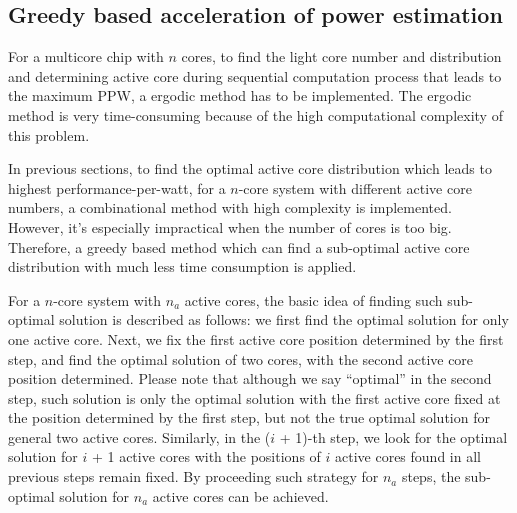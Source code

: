 \subsection{Greedy based acceleration of power estimation}
For a multicore chip with $n$ cores, to find the light core number and distribution and determining active core during sequential computation process that leads to the maximum PPW, a ergodic method has to be implemented. The ergodic method is very time-consuming because of the high computational complexity of this problem. 

In previous sections, to find the optimal active core distribution which leads to highest performance-per-watt, for a $n$-core system with different active core numbers,  a combinational method with high complexity is implemented. However, it's  especially impractical when the number of cores is too big. Therefore, a greedy based method which can find a sub-optimal active core distribution with much less time consumption is applied.

For a $n$-core system with $n_{a}$ active cores, the basic idea of finding such sub-optimal solution is described as follows: we first find the optimal solution for only one active core. Next, we fix the first active core position determined by the first step, and find the optimal solution of two cores, with the second active core position determined. Please note that although we say “optimal” in the second step, such solution is only the optimal solution with the first active core fixed at the position determined by the first step, but not the true optimal solution for general two active cores. Similarly, in the ($i$ + 1)-th step, we look for the optimal solution for $i$ + 1 active cores with the positions of $i$ active cores found in all previous steps remain fixed. By proceeding such strategy for $n_{a}$ steps, the sub-optimal solution for $n_{a}$ active cores can be achieved.